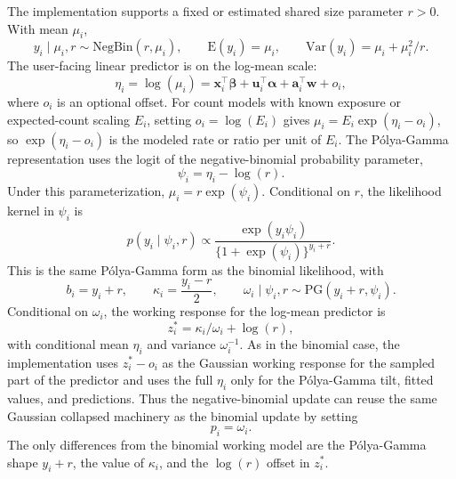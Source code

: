 \documentclass[11pt]{article}
\newcommand{\bw}{\bm{w}}
\newcommand{\balpha}{\bm{\alpha}}
\newcommand{\bbeta}{\bm{\beta}}
\newcommand{\bu}{\bm{u}}
\newcommand{\ba}{\bm{a}}
\newcommand{\bx}{\bm{x}}
\newcommand{\trans}{^\top}
\begin{document}
The implementation supports a fixed or estimated shared size parameter $r>0$. With mean $\mu_i$,
\begin{equation}
  y_i \mid \mu_i,r \sim \mathrm{NegBin}(r,\mu_i),
  \qquad
  \mathrm{E}(y_i)=\mu_i,\qquad
  \mathrm{Var}(y_i)=\mu_i+\mu_i^2/r .
\end{equation}
The user-facing linear predictor is on the log-mean scale:
\begin{equation}
  \eta_i = \log(\mu_i)
    = \bx_i\trans \bbeta + \bu_i\trans \balpha
      + \ba_i\trans \bw + o_i,
\end{equation}
where $o_i$ is an optional offset. For count models with known exposure or expected-count scaling $E_i$, setting $o_i=\log(E_i)$ gives $\mu_i=E_i\exp(\eta_i-o_i)$, so $\exp(\eta_i-o_i)$ is the modeled rate or ratio per unit of $E_i$. The P{\'o}lya-Gamma representation uses the logit of the negative-binomial probability parameter,
\begin{equation}
  \psi_i = \eta_i - \log(r).
\end{equation}
Under this parameterization, $\mu_i=r\exp(\psi_i)$. Conditional on $r$, the likelihood kernel in $\psi_i$ is
\begin{equation}
  p(y_i\mid \psi_i,r)
    \propto
    \frac{\exp(y_i\psi_i)}
         {\{1+\exp(\psi_i)\}^{y_i+r}} .
\end{equation}
This is the same P{\'o}lya-Gamma form as the binomial likelihood, with
\begin{equation}
  b_i = y_i+r,\qquad
  \kappa_i = \frac{y_i-r}{2},\qquad
  \omega_i \mid \psi_i,r \sim \mathrm{PG}(y_i+r,\psi_i).
\end{equation}
Conditional on $\omega_i$, the working response for the log-mean predictor is
\begin{equation}
  z_i^\ast = \kappa_i/\omega_i + \log(r),
\end{equation}
with conditional mean $\eta_i$ and variance $\omega_i^{-1}$. As in the binomial case, the implementation uses $z_i^\ast-o_i$ as the Gaussian working response for the sampled part of the predictor and uses the full $\eta_i$ only for the P{\'o}lya-Gamma tilt, fitted values, and predictions. Thus the negative-binomial update can reuse the same Gaussian collapsed machinery as the binomial update by setting
\begin{equation}
  p_i = \omega_i.
\end{equation}
The only differences from the binomial working model are the P{\'o}lya-Gamma shape $y_i+r$, the value of $\kappa_i$, and the $\log(r)$ offset in $z_i^\ast$.
\end{document}
